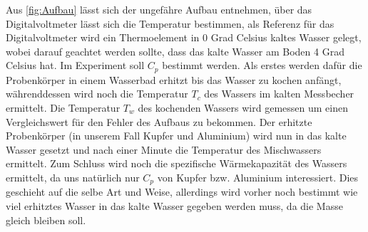 Aus \autoref{fig:Aufbau} lässt sich der ungefähre Aufbau entnehmen, über das Digitalvoltmeter lässt sich die Temperatur bestimmen, als Referenz für das Digitalvoltmeter wird ein Thermoelement in 0 Grad Celsius kaltes Wasser gelegt, wobei darauf geachtet werden sollte, dass das kalte Wasser am Boden 4 Grad Celsius hat.
Im Experiment soll $C_p$ bestimmt werden.
Als erstes werden dafür die Probenkörper in einem Wasserbad erhitzt bis
das Wasser zu kochen anfängt, währenddessen wird noch die Temperatur $T_c$ des Wassers im kalten Messbecher ermittelt. Die Temperatur $T_w$ des kochenden Wassers wird gemessen um einen Vergleichswert für den Fehler des Aufbaus zu bekommen.
Der erhitzte Probenkörper (in unserem Fall Kupfer und Aluminium) wird nun in das kalte Wasser gesetzt und nach einer Minute die Temperatur des Mischwassers ermittelt.
Zum Schluss wird noch die spezifische Wärmekapazität des Wassers ermittelt, da uns natürlich nur $C_p$ von Kupfer bzw. Aluminium interessiert. Dies geschieht auf die selbe Art und Weise, allerdings wird vorher noch bestimmt wie viel erhitztes Wasser in das kalte Wasser gegeben werden muss, da die Masse gleich bleiben soll.
